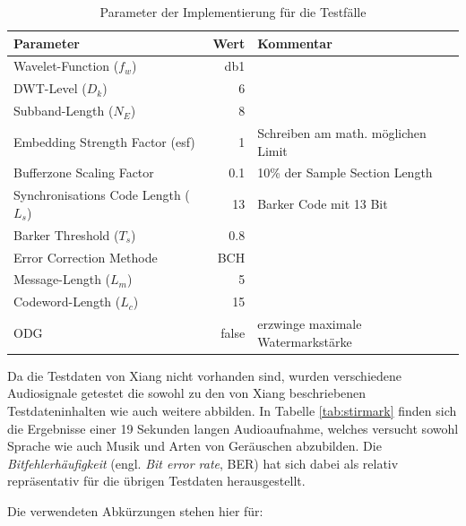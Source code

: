 \begin{table}[h]
\begin{tabular}{lrl}
\hline
\textbf{Parameter} 	 & \textbf{Wert} & \textbf{Kommentar} 	 \\ \hline
Wavelet-Function (${f}_{w}$)             & db1           & 	 \\
DWT-Level (${D}_{k}$) 	 & 6             & 	 \\
Subband-Length (${N}_{E}$)               & 8             & 	 \\
Embedding Strength Factor (esf)          & 1             & Schreiben am math. möglichen Limit       \\
Bufferzone Scaling Factor                & 0.1           & 10\% der Sample Section Length           \\
Synchronisations Code Length (${L}_{s}$) & 13            & Barker Code mit 13 Bit 	\\
Barker Threshold (${T}_{s}$)             & 0.8           & 	 \\
Error Correction Methode                 & BCH           & 	 \\
Message-Length (${L}_{m}$)               & 5             & 	 \\
Codeword-Length (${L}_{c}$)              & 15            & 	 \\
ODG 			 & false         & erzwinge maximale Watermarkstärke  		\\ \hline
 	 	
\end{tabular} 	
\caption{Parameter der Implementierung für die Testfälle}
\label{tab:algo_settings}
\end{table}	

Da die Testdaten von Xiang nicht vorhanden sind, wurden verschiedene Audiosignale getestet die sowohl zu den von Xiang beschriebenen Testdateninhalten wie auch weitere abbilden. In Tabelle \ref{tab:stirmark} finden sich die Ergebnisse einer 19 Sekunden langen Audioaufnahme, welches versucht sowohl Sprache wie auch Musik und Arten von Geräuschen abzubilden. Die \textit{Bitfehlerhäufigkeit} (engl. \textit{Bit error rate},  BER) hat sich dabei als relativ repräsentativ für die übrigen Testdaten herausgestellt. 

Die verwendeten Abkürzungen stehen hier für:

